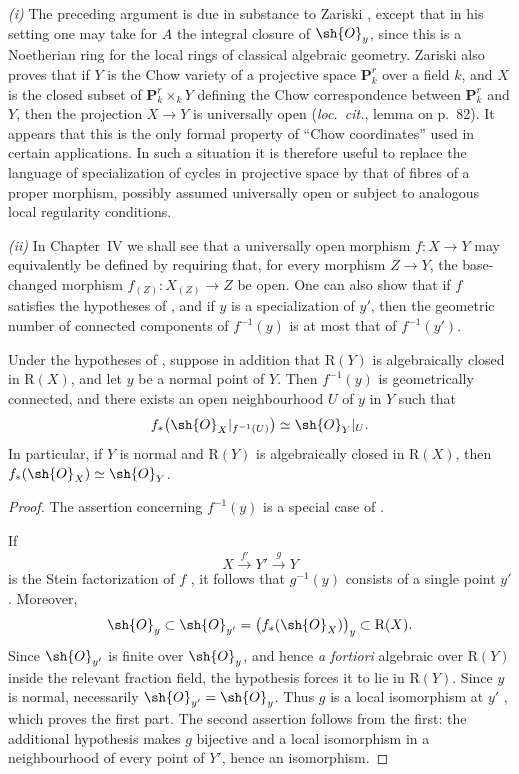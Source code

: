 \begin{remark}[4.3.11]
\label{III.4.3.11}
\emph{(i)}
The preceding argument is due in substance to Zariski
\cite{I-20}, except that in his setting one may take for $A$ the
integral closure of $\sh{O}_y$, since this is a Noetherian ring for
the local rings of classical algebraic geometry.  Zariski also
proves that if $Y$ is the Chow variety of a projective space
$\mathbf{P}_k^r$ over a field $k$, and $X$ is the closed subset of
$\mathbf{P}_k^r\times_kY$ defining the Chow correspondence between
$\mathbf{P}_k^r$ and $Y$, then the projection $X\to Y$ is
universally open (\emph{loc.\ cit.}, lemma on p.~82).
It appears that this is the only formal property of ``Chow
coordinates'' used in certain applications.  In such a situation it
is therefore useful to replace the language of specialization of
cycles in projective space by that of fibres of a proper morphism,
possibly assumed universally open or subject to analogous local
regularity conditions.

\emph{(ii)}
In Chapter~IV we shall see that a universally open morphism
$f:X\to Y$ may equivalently be defined by requiring that, for every
morphism $Z\to Y$, the base-changed morphism
$f_{(Z)}:X_{(Z)}\to Z$ be open.  One can also show that if $f$
satisfies the hypotheses of , and if $y$ is a
specialization of $y'$, then the geometric number of connected
components of $f^{-1}(y)$ is at most that of $f^{-1}(y')$.
\end{remark}

\begin{corollary}[4.3.12]
\label{III.4.3.12}
Under the hypotheses of , suppose in addition that
$\mathrm{R}(Y)$ is algebraically closed in $\mathrm{R}(X)$, and let $y$ be a
normal point of $Y$.  Then $f^{-1}(y)$ is geometrically connected,
and there exists an open neighbourhood $U$ of $y$ in $Y$ such that
\[
  f_*\bigl(\sh{O}_X|_{f^{-1}(U)}\bigr)
  \simeq
  \sh{O}_Y|_U.
\]
In particular, if $Y$ is normal and $\mathrm{R}(Y)$ is algebraically closed
in $\mathrm{R}(X)$, then $f_*(\sh{O}_X)\simeq\sh{O}_Y$.
\end{corollary}

\begin{proof}
The assertion concerning $f^{-1}(y)$ is a special case of
.


If
\[
  X\xrightarrow{f'}Y'\xrightarrow{g}Y
\]
is the Stein factorization of $f$ , it follows that
$g^{-1}(y)$ consists of a single point $y'$.  Moreover,
\[
  \sh{O}_y
  \subset
  \sh{O}_{y'}
  =
  \bigl(f_*(\sh{O}_X)\bigr)_y
  \subset
  \mathrm{R}(X).
\]
Since $\sh{O}_{y'}$ is finite over $\sh{O}_y$, and hence
\emph{a fortiori} algebraic over $\mathrm{R}(Y)$ inside the relevant
fraction field, the hypothesis forces it to lie in $\mathrm{R}(Y)$.  Since
$y$ is normal, necessarily $\sh{O}_{y'}=\sh{O}_y$.  Thus $g$ is a
local isomorphism at $y'$ , which proves the first
part.  The second assertion follows from the first: the additional
hypothesis makes $g$ bijective and a local isomorphism in a
neighbourhood of every point of $Y'$, hence an isomorphism.
\end{proof}

